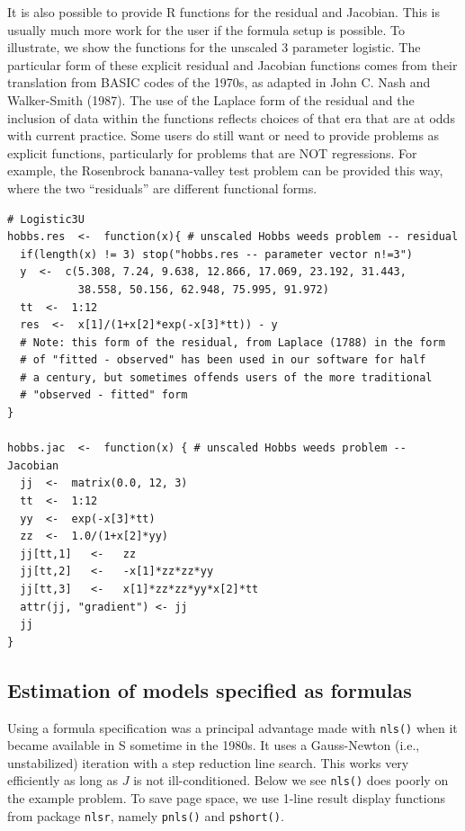 It is also possible to provide R functions for the residual and Jacobian.
This is usually much more work for the user if the formula setup is possible.
To illustrate, we show the functions for the unscaled 3 parameter logistic.
The particular form of these explicit residual and Jacobian functions comes from
their translation from BASIC codes of the 1970s, as adapted in John C. Nash and Walker-Smith (1987). The use
of the Laplace form of the residual and the inclusion of data within the functions
reflects choices of that era that are at odds with current practice. Some users
do still want or need to provide problems as explicit functions, particularly
for problems that are NOT regressions. For example, the Rosenbrock banana-valley
test problem can be provided this way, where the two ``residuals'' are different
functional forms.

\begin{verbatim}
# Logistic3U
hobbs.res  <-  function(x){ # unscaled Hobbs weeds problem -- residual
  if(length(x) != 3) stop("hobbs.res -- parameter vector n!=3")
  y  <-  c(5.308, 7.24, 9.638, 12.866, 17.069, 23.192, 31.443, 
           38.558, 50.156, 62.948, 75.995, 91.972)
  tt  <-  1:12
  res  <-  x[1]/(1+x[2]*exp(-x[3]*tt)) - y
  # Note: this form of the residual, from Laplace (1788) in the form
  # of "fitted - observed" has been used in our software for half
  # a century, but sometimes offends users of the more traditional
  # "observed - fitted" form
}

hobbs.jac  <-  function(x) { # unscaled Hobbs weeds problem -- Jacobian
  jj  <-  matrix(0.0, 12, 3)
  tt  <-  1:12
  yy  <-  exp(-x[3]*tt)
  zz  <-  1.0/(1+x[2]*yy)
  jj[tt,1]   <-   zz
  jj[tt,2]   <-   -x[1]*zz*zz*yy
  jj[tt,3]   <-   x[1]*zz*zz*yy*x[2]*tt
  attr(jj, "gradient") <- jj
  jj
}
\end{verbatim}

\subsection{Estimation of models specified as formulas}\label{estimation-of-models-specified-as-formulas}

Using a formula specification was a principal advantage made
with \texttt{nls()} when it became available in S sometime in the 1980s. It uses a
Gauss-Newton (i.e., unstabilized) iteration with a step reduction line
search. This works very efficiently as long as \(J\) is not ill-conditioned.
Below we see \texttt{nls()} does poorly on the example problem. To save page space,
we use 1-line result display functions from package \texttt{nlsr}, namely \texttt{pnls()}
and \texttt{pshort()}.


